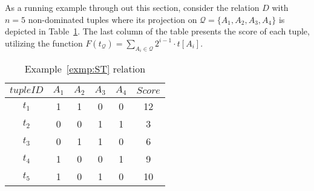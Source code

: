 \begin{exmp}\label{exmp:ST} 
As a running example through out this section, consider the relation $D$ with $n=5$ non-dominated tuples where its projection on $\mathcal{Q}=\{A_1,A_2,A_3,A_4\}$ is depicted in Table~\ref{tab:skylineTreeRunningExample}. 
The last column of the table presents the score of each tuple, utilizing the function $F(t_{\mathcal{Q}}) = \sum_{A_i \in \mathcal{Q}} 2^{i-1} \cdot t[A_i]$.
\end{exmp}



\begin{table}[!t]
\centering
\caption{Example~\ref{exmp:ST} relation}\label{tab:skylineTreeRunningExample}
\begin{tiny}
\begin{tabular}{cccccc}
    \hline 
    $tupleID$ & $A_1$ & $A_2$ & $A_3$ & $A_4$ & $Score$\\
    \hline 
    $t_1$ & 1 & 1 & 0 & 0 & 12\\
    \hline
    $t_2$ & 0 & 0 & 1 & 1 & 3\\
    \hline
    $t_3$ & 0 & 1 & 1 & 0 & 6\\
    \hline
    $t_4$ & 1 & 0 & 0 & 1 & 9\\
    \hline
    $t_5$ & 1 & 0 & 1 & 0 & 10\\
    \hline
\end{tabular}
\end{tiny}
\end{table}

